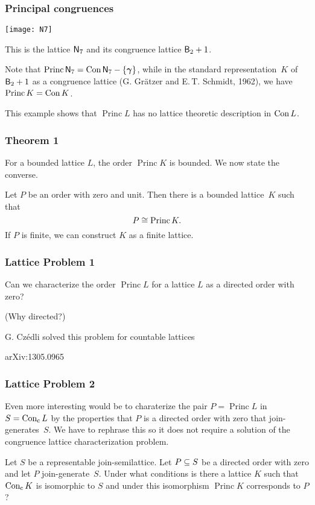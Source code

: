 \documentclass[leqno]{beamer}
\DeclareMathOperator{\Princ}{Princ}
\DeclareMathOperator{\Conc}{\tup{Con}_\tup{c}}
\begin{document}
\begin{frame}
\frametitle{Principal congruences}
\centerline{\texttt{[image: N7]}}

This is the lattice $\mathsf{N}_{7}$ 
and its congruence lattice $\mathsf{B}_{2} + 1$.

Note that $\Princ \SN 7 = {\Con \SN 7} - \set{\bgg}$,
while in the standard representation~$K$
of $\mathsf{B}_{2} + 1$ as a congruence lattice
(G. Gr\"atzer and E.\,T. Schmidt, 1962), 
we have $\Princ K = \Con K$.
 
 \pause
This example shows that $\Princ L$
has no lattice theoretic description in $\operatorname{Con} L$.
\end{frame}

\begin{frame}
\frametitle{Theorem 1}
For a bounded lattice $L$, the order $\Princ K$ is bounded. 
We now state the converse.
\pause
\begin{theorem}
Let $P$ be an order with zero and unit.
Then there is a bounded lattice~$K$ such that
\[
   P \iso \Princ K.
\]
If $P$ is finite, we can construct $K$ as a finite lattice.
\end{theorem}


\end{frame}

\begin{frame}
\frametitle{Lattice Problem 1}
\begin{problem}
Can we characterize the order $\Princ L$ for a lattice $L$
as a directed order with zero? 
\end{problem}

\pause
(Why directed?)
\pause

G. Cz\'edli solved this problem for countable lattices 

arXiv:1305.0965
\end{frame}

\begin{frame}
\frametitle{Lattice Problem 2}
Even more interesting would be to charaterize 
the pair $P = \Princ L$ in $S =\Conc L$ by the properties
that $P$ is a directed order with zero 
that join-generates~$S$. 
We have to rephrase this 
so it does not require a solution 
of the congruence lattice characterization problem.
\pause
\begin{problem}
Let $S$ be a representable join-semilattice. 
Let $P \subseteq S$ be a directed order with zero 
and let $P$ join-generate~$S$.
Under what conditions is there a lattice $K$ such 
that $\Conc K$ is isomorphic to $S$
and under this isomorphism $\Princ K$ corresponds to $P$?
\end{problem}
\end{frame}
\end{document}
